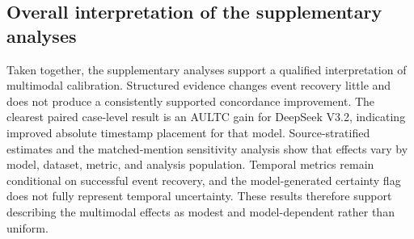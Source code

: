 \FloatBarrier
\subsection{Overall interpretation of the supplementary analyses}\label{ch08:supp:overall-interpretation}
\noindent
Taken together, the supplementary analyses support a qualified interpretation of multimodal calibration.
Structured evidence changes event recovery little and does not produce a consistently supported concordance improvement.
The clearest paired case-level result is an AULTC gain for DeepSeek V3.2, indicating improved absolute timestamp placement for that model.
Source-stratified estimates and the matched-mention sensitivity analysis show that effects vary by model, dataset, metric, and analysis population.
Temporal metrics remain conditional on successful event recovery, and the model-generated certainty flag does not fully represent temporal uncertainty.
These results therefore support describing the multimodal effects as modest and model-dependent rather than uniform.


